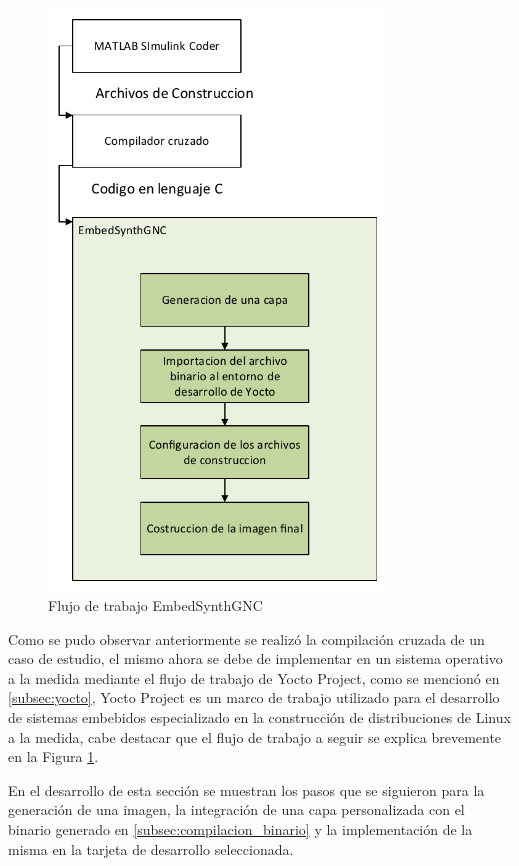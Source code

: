 \begin{figure}[h!]
    \centering
    \includegraphics[width=0.8\textwidth]{fig/especifico_2/embedsynthgnc/diagrama_general_embedsynthgnc.pdf}
    \caption{Flujo de trabajo EmbedSynthGNC}
    \label{fig:diagrama_embed_synth_gnc}
\end{figure}

Como se pudo observar anteriormente se realizó la compilación cruzada de un caso de estudio, el mismo ahora se debe de implementar en un sistema operativo a la medida mediante el flujo de trabajo de Yocto Project, como se mencionó en \ref{subsec:yocto}, Yocto Project es un marco de trabajo utilizado para el desarrollo de sistemas embebidos especializado en la construcción de distribuciones de Linux a la medida, cabe destacar que el flujo de trabajo a seguir se explica brevemente en la Figura \ref{fig:diagrama_embed_synth_gnc}. 

En el desarrollo de esta sección se muestran los pasos que se siguieron para la generación de una imagen, la integración de una capa personalizada con el binario generado en \ref{subsec:compilacion_binario} y la implementación de la misma en la tarjeta de desarrollo seleccionada.


